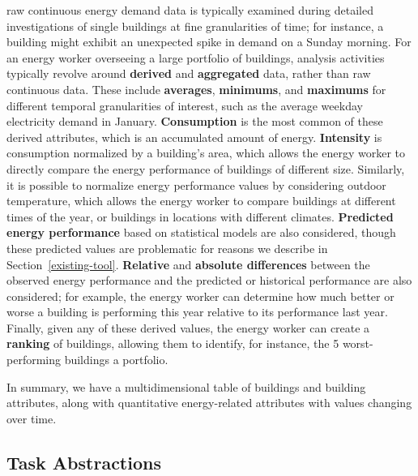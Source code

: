 \documentclass[journal]{vgtc}                %
\newcommand{\bstart}[1]{\vspace{1mm} \noindent{\textbf{#1:}}}
\begin{document}
\bstart{Derived data} raw continuous energy demand data is typically examined during detailed investigations of single buildings at fine granularities of time; for instance, a building might exhibit an unexpected spike in demand on a Sunday morning. 
For an energy worker overseeing a large portfolio of buildings, analysis activities typically revolve around {\bf derived} and {\bf aggregated} data, rather than raw continuous data. 
These include {\bf averages}, {\bf minimums}, and {\bf maximums} for different temporal granularities of interest, such as the average weekday electricity demand in January.
{\bf Consumption} is the most common of these derived attributes, which is an accumulated amount of energy.
{\bf Intensity} is consumption normalized by a building's area, which allows the energy worker to directly compare the energy performance of buildings of different size.
Similarly, it is possible to normalize energy performance values by considering outdoor temperature, which allows the energy worker to compare buildings at different times of the year, or buildings in locations with different climates.
{\bf Predicted energy performance} based on statistical models are also considered, though these predicted values are problematic for reasons we describe in Section~\ref{existing-tool}.
{\bf Relative} and {\bf absolute differences} between the observed energy performance and the predicted or historical performance are also considered; for example, the energy worker can determine how much better or worse a building is performing this year relative to its performance last year.
Finally, given any of these derived values, the energy worker can create a {\bf ranking} of buildings, allowing them to identify, for instance, the 5 worst-performing buildings a portfolio.

In summary, we have a multidimensional table of buildings and building attributes, along with quantitative energy-related attributes with values changing over time.


\subsection{Task Abstractions}
\label{task-abstractions}

\end{document}
